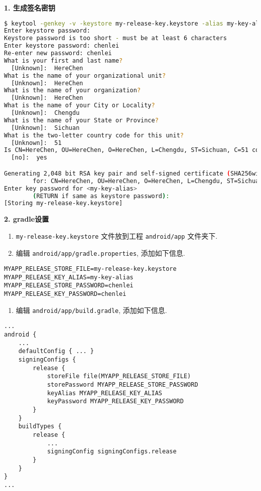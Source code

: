 \textbf{1. 生成签名密钥}

\begin{lstlisting}[language=bash]
$ keytool -genkey -v -keystore my-release-key.keystore -alias my-key-alias -keyalg RSA -keysize 2048 -validity 10000
Enter keystore password:
Keystore password is too short - must be at least 6 characters
Enter keystore password: chenlei
Re-enter new password: chenlei
What is your first and last name?
  [Unknown]:  HereChen
What is the name of your organizational unit?
  [Unknown]:  HereChen
What is the name of your organization?
  [Unknown]:  HereChen
What is the name of your City or Locality?
  [Unknown]:  Chengdu
What is the name of your State or Province?
  [Unknown]:  Sichuan
What is the two-letter country code for this unit?
  [Unknown]:  51
Is CN=HereChen, OU=HereChen, O=HereChen, L=Chengdu, ST=Sichuan, C=51 correct?
  [no]:  yes

Generating 2,048 bit RSA key pair and self-signed certificate (SHA256withRSA) with a validity of 10,000 days
        for: CN=HereChen, OU=HereChen, O=HereChen, L=Chengdu, ST=Sichuan, C=51
Enter key password for <my-key-alias>
        (RETURN if same as keystore password):
[Storing my-release-key.keystore]
\end{lstlisting}

\textbf{2. gradle设置}

\begin{enumerate}
\def\labelenumi{\arabic{enumi}.}
\tightlist
\item
  \lstinline!my-release-key.keystore! 文件放到工程
  \lstinline!android/app! 文件夹下.
\item
  编辑 \lstinline!android/app/gradle.properties!, 添加如下信息.
\end{enumerate}

\begin{lstlisting}
MYAPP_RELEASE_STORE_FILE=my-release-key.keystore
MYAPP_RELEASE_KEY_ALIAS=my-key-alias
MYAPP_RELEASE_STORE_PASSWORD=chenlei
MYAPP_RELEASE_KEY_PASSWORD=chenlei
\end{lstlisting}

\begin{enumerate}
\def\labelenumi{\arabic{enumi}.}
\setcounter{enumi}{2}
\tightlist
\item
  编辑 \lstinline!android/app/build.gradle!, 添加如下信息.
\end{enumerate}

\begin{lstlisting}
...
android {
    ...
    defaultConfig { ... }
    signingConfigs {
        release {
            storeFile file(MYAPP_RELEASE_STORE_FILE)
            storePassword MYAPP_RELEASE_STORE_PASSWORD
            keyAlias MYAPP_RELEASE_KEY_ALIAS
            keyPassword MYAPP_RELEASE_KEY_PASSWORD
        }
    }
    buildTypes {
        release {
            ...
            signingConfig signingConfigs.release
        }
    }
}
...
\end{lstlisting}

